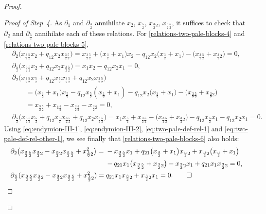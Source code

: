 \documentclass[10pt,a4paper]{amsart}
\providecommand{\qed}{\ensuremath{\square}}
\numberwithin{equation}{section}
\newcommand{\tresdos}{\frac{3}{2}}
\newcommand{\cincodos}{\frac{5}{2}}
\begin{document}
\begin{proof}
\begin{proof}[Proof of Step~4]
As $\partial_1$ and $\partial_{\tresdos}$ annihilate $x_{2}$, $x_{\cincodos}$, $x_{\tresdos2}$, $x_{\tresdos\cincodos}$,
it suffices to check that $\partial_2$ and $\partial_\cincodos$ annihilate each of these relations. For \eqref{relations-two-pale-blocks-4} and \eqref{relations-two-pale-blocks-5},
\begin{align*}
&\partial_2 \big( x_{\tresdos\cincodos}x_{2} +q_{12} x_{2}x_{\tresdos\cincodos} \big) =
x_{\tresdos\cincodos}+\big(x_\tresdos+x_1\big)x_{2}
 -q_{12} x_{2}\big(x_\tresdos+x_1\big) -\big(x_{\tresdos\cincodos}+x_{\tresdos2}\big)=0,
\\
&\partial_{\cincodos} \big( x_{\tresdos\cincodos}x_{2} +q_{12} x_{2}x_{\tresdos\cincodos} \big) =
x_1x_{2} -q_{12} x_{2}x_1=0,
\\
&\partial_2 \big( x_{\tresdos\cincodos}x_{\cincodos}+q_{12} x_{\cincodos}x_{\tresdos\cincodos} + q_{12}x_{2}x_{\tresdos\cincodos} \big)
\\ &\qquad
{}=\big(x_\tresdos+x_1\big)x_{\cincodos}-q_{12} x_{\cincodos}(x_\tresdos+x_1)
 - q_{12}x_{2}\big(x_\tresdos+x_1\big)-\big(x_{\tresdos\cincodos}+x_{\tresdos2}\big)
 \\ &\qquad
= x_{\tresdos\cincodos}+x_{1\cincodos}-x_{\tresdos\cincodos}-x_{\tresdos2}=0,
\\
 &\partial_{\cincodos} \big( x_{\tresdos\cincodos}x_{\cincodos}\!+q_{12} x_{\cincodos}x_{\tresdos\cincodos} \!+ q_{12}x_{2}x_{\tresdos\cincodos} \big)=
x_1x_{\cincodos}
\!+x_{\tresdos\cincodos}
-\!\big(x_{\tresdos\cincodos}\!+x_{\tresdos2}\big)\!
-q_{12} x_{\cincodos}x_1 -q_{12}x_{2}x_1=0.
\end{align*}
Using \eqref{eq:endymion-III-1}, \eqref{eq:endymion-III-2}, \eqref{eq:two-pale-def-rel-1} and
\eqref{eq:two-pale-def-rel-other-1}, we see finally that \eqref{relations-two-pale-blocks-6} also holds:
\begin{align*}
&\begin{aligned}
\partial_2 \big( x_{\tresdos\cincodos}x_{\tresdos2}-x_{\tresdos2}x_{\tresdos\cincodos} + x_{\tresdos2}^2 \big) ={}&
-x_{\tresdos\cincodos}x_1+q_{21}\big(x_{\tresdos}+x_1\big)x_{\tresdos2}
+x_{\tresdos2}\big(x_{\tresdos}+x_1\big)
\\
& -q_{21}x_1\big(x_{\tresdos\cincodos}+x_{\tresdos2}\big)
- x_{\tresdos2}x_1 +q_{21}x_1x_{\tresdos2}=0,
\end{aligned}
\\
&\partial_{\cincodos} ( x_{\tresdos\cincodos}x_{\tresdos2}-x_{\tresdos2}x_{\tresdos\cincodos} + x_{\tresdos2}^2 ) = q_{21}x_1x_{\tresdos2}+x_{\tresdos2}x_1=0. \tag*{\qed}
\end{align*}
\renewcommand{\qed}{}
\end{proof}


\end{proof}
\end{document}
